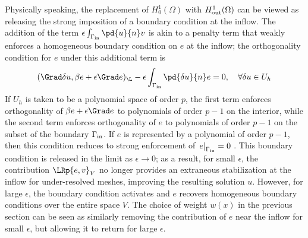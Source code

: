 Physically speaking, the replacement of $H^1_0(\Omega)$ with $H^1_{\rm out}(\Omega)$ can be viewed as releasing the strong imposition of a boundary condition at the inflow.  
The addition of the term $\epsilon\int_{\Gamma_{\rm in}} \pd{u}{n}v$ is akin to a penalty term that weakly enforces a homogeneous boundary condition on $e$ at the inflow; the orthogonality condition for $e$ under this additional term is
\[
(\Grad \delta u, \beta e + \epsilon \Grad e)_{\L} - \epsilon\int_{\Gamma_{\rm in}} \pd{\delta u}{n}e = 0, \quad \forall \delta u \in U_h
\]
If $U_h$ is taken to be a polynomial space of order $p$, the first term enforces orthogonality of $\beta e + \epsilon \Grad e$ to polynomials of order $p-1$ on the interior, while the second term enforces orthogonality of $e$ to polynomials of order $p-1$ on the subset of the boundary $\Gamma_{\rm in}$.  If $e$ is represented by a polynomial of order $p-1$, then this condition reduces to strong enforcement of $\left. e\right|_{\Gamma_{\rm in}}=0$ \cite{brenner2008mathematical}.  This boundary condition is released in the limit as $\epsilon \rightarrow 0$; as a result, for small $\epsilon$, the contribution $\LRp{e,v}_V$ no longer provides an extraneous stabilization at the inflow for under-resolved meshes, improving the resulting solution $u$.  However, for large $\epsilon$, the boundary condition activates and $e$ recovers homogeneous boundary conditions over the entire space $V$.  The choice of weight $w(x)$ in the previous section can be seen as similarly removing the contribution of $e$ near the inflow for small $\epsilon$, but allowing it to return for large $\epsilon$.  

